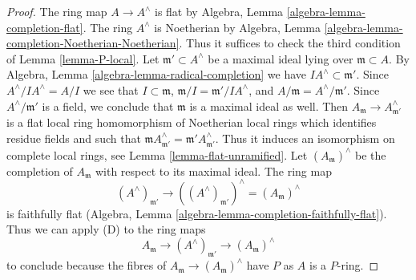 \documentclass[10pt,a4paper]{amsart}
\theoremstyle{plain}
\theoremstyle{definition}
\theoremstyle{remark}
\numberwithin{equation}{subsection}
\begin{document}
\begin{proof}
The ring map $A \to A^\wedge$ is flat by
Algebra, Lemma \ref{algebra-lemma-completion-flat}.
The ring $A^\wedge$ is Noetherian by
Algebra, Lemma \ref{algebra-lemma-completion-Noetherian-Noetherian}.
Thus it suffices to check the third condition of
Lemma \ref{lemma-P-local}.
Let $\mathfrak m' \subset A^\wedge$ be a maximal ideal lying over
$\mathfrak m \subset A$.
By Algebra, Lemma \ref{algebra-lemma-radical-completion}
we have $IA^\wedge \subset \mathfrak m'$.
Since $A^\wedge/IA^\wedge = A/I$ we see that
$I \subset \mathfrak m$, $\mathfrak m/I = \mathfrak m'/IA^\wedge$, and
$A/\mathfrak m = A^\wedge/\mathfrak m'$. Since $A^\wedge/\mathfrak m'$
is a field, we conclude that $\mathfrak m$ is a maximal ideal as well.
Then $A_\mathfrak m \to A^\wedge_{\mathfrak m'}$ is a flat local
ring homomorphism of Noetherian local rings
which identifies residue fields and such that
$\mathfrak m A^\wedge_{\mathfrak m'} = \mathfrak m'A^\wedge_{\mathfrak m'}$.
Thus it induces an isomorphism on complete local rings, see
Lemma \ref{lemma-flat-unramified}.
Let $(A_\mathfrak m)^\wedge$ be the completion of $A_\mathfrak m$
with respect to its maximal ideal.
The ring map
$$
(A^\wedge)_{\mathfrak m'} \to
((A^\wedge)_{\mathfrak m'})^\wedge = (A_\mathfrak m)^\wedge
$$
is faithfully flat (Algebra, Lemma
\ref{algebra-lemma-completion-faithfully-flat}). Thus we can apply
(D) to the ring maps
$$
A_\mathfrak m \to (A^\wedge)_{\mathfrak m'} \to (A_\mathfrak m)^\wedge
$$
to conclude because the fibres of
$A_\mathfrak m \to (A_\mathfrak m)^\wedge$
have $P$ as $A$ is a $P$-ring.
\end{proof}
\end{document}
